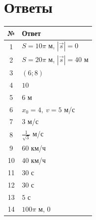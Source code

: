 \documentclass[a4paper,12pt]{article}
\begin{document}
\clearpage

\section*{Ответы}

\renewcommand{\arraystretch}{1.3}

\begin{center}
\begin{tabularx}{\linewidth}{cX}
\toprule
№ & Ответ\\
\midrule
1 & $S=10\pi$ м, $|\vec{s}|=0$\\
2 & $S=20\pi$ м, $|\vec{s}|=40$ м\\
3 & $(6;8)$\\
4 & $10$\\
5 & $6$ м\\
6 & $x_0=4,\ v=5$ м/с\\
7 & $3$ м/с\\
8 & $\frac1{\sqrt3}$ м/с\\
9 & $60$ км/ч\\
10 & $40$ км/ч\\
11 & $30$ с\\
12 & $30$ с\\
13 & $5$ с\\
14 & $100\pi$ м, $0$\\
\bottomrule
\end{tabularx}
\end{center}

\clearpage
\end{document}
